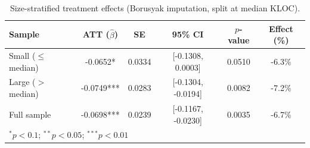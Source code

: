 \begin{table}[t]
\centering
\caption{Size-stratified treatment effects (Borusyak imputation, split at median KLOC).}
\label{tab:size_stratified}
\begin{tabular}{lccccc}
\toprule
Sample & ATT ($\hat{\beta}$) & SE & 95\% CI & $p$-value & Effect (\%) \\
\midrule
Small ($\leq$ median) & -0.0652* & 0.0334 & [-0.1308, 0.0003] & 0.0510 & -6.3\% \\
Large ($>$ median) & -0.0749*** & 0.0283 & [-0.1304, -0.0194] & 0.0082 & -7.2\% \\
Full sample & -0.0698*** & 0.0239 & [-0.1167, -0.0230] & 0.0035 & -6.7\% \\
\bottomrule
\multicolumn{6}{l}{\footnotesize $^{*}p<0.1$; $^{**}p<0.05$; $^{***}p<0.01$} \\
\end{tabular}
\end{table}
